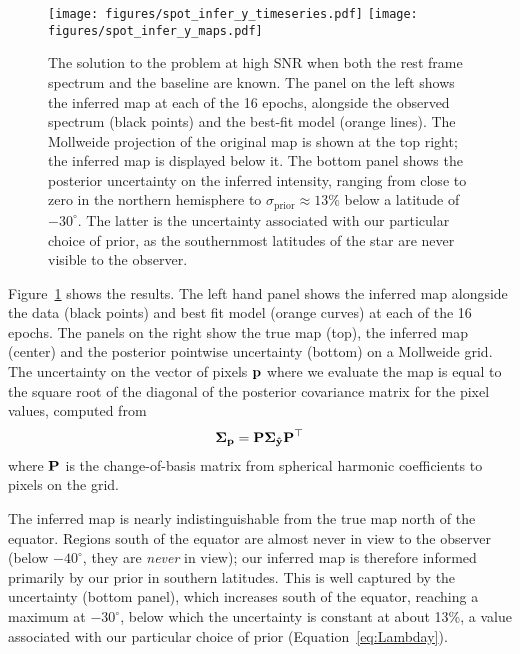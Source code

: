 \documentclass[modern]{aastex631}
\begin{document}
\begin{figure}[p!]
    \begin{centering}
        \texttt{[image: figures/spot\_infer\_y\_timeseries.pdf]}
        \texttt{[image: figures/spot\_infer\_y\_maps.pdf]}
        \caption{%
            The solution to the \spot problem at high SNR when both the rest frame spectrum and the baseline are known.
            The panel on the left shows the inferred map at each of the 16
            epochs, alongside the observed spectrum (black points) and the best-fit model (orange lines). 
            The Mollweide projection of the original map is shown at the top right; the inferred map is displayed below it. 
            The bottom panel shows the posterior uncertainty on the inferred intensity, ranging from close to zero in the northern hemisphere to $\sigma_\mathrm{prior} \approx 13\%$ below a latitude of $-30^\circ$. 
            The latter is the uncertainty associated with our particular choice of prior, as the southernmost latitudes of the star are never visible to the observer.
        }
        \label{fig:spot_infer_y}
    \end{centering}
\end{figure}

Figure~\ref{fig:spot_infer_y} shows the results.
The left hand panel shows the inferred map alongside the data (black points) and best fit model (orange curves) at each of the 16 epochs.
The panels on the right show the true map (top), the inferred map (center)
and the posterior pointwise uncertainty (bottom) on a Mollweide grid. 
The uncertainty on the vector of pixels ${\mathbf{p}}$ where we evaluate the map is equal to the square root of the diagonal of the posterior covariance matrix for the pixel values, computed from
%
\begin{align}
    \label{eq:spotstar:uncert}
    \boldsymbol{\Sigma}_{\mathbf{p}} = {\mathbf{P}} \boldsymbol{\Sigma}_{\mathbf{\hat{y}}}{\mathbf{P}}^\top
\end{align}
%
where ${\mathbf{P}}$ is the change-of-basis matrix from spherical harmonic coefficients to pixels on the grid.

The inferred map is nearly indistinguishable from the true map north of the equator. Regions south of the equator are almost never in view to the observer (below $-40^\circ$, they are \emph{never} in view); our inferred map is therefore informed primarily by our prior in southern latitudes.
This is well captured by the uncertainty (bottom panel), which increases south of the equator, reaching a maximum at $-30^\circ$, below which the uncertainty is constant at about 13\%, a value associated with our particular choice of prior (Equation~\ref{eq:Lambday}).
\end{document}
